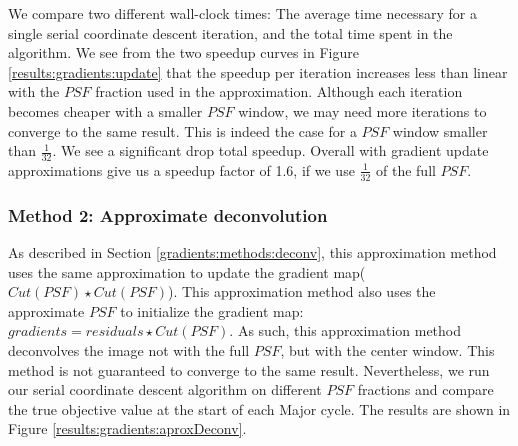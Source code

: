 We compare two different wall-clock times: The average time necessary for a single serial coordinate descent iteration, and the total time spent in the algorithm. We see from the two speedup curves in Figure \ref{results:gradients:update} that the speedup per iteration increases less than linear with the $PSF$ fraction used in the approximation. Although each iteration becomes cheaper with a smaller $PSF$ window, we may need more iterations to converge to the same result. This is indeed the case for a $PSF$ window smaller than $\frac{1}{32}$. We see a significant drop total speedup. Overall with gradient update approximations give us a speedup factor of 1.6, if we use $\frac{1}{32}$ of the full $PSF$.


\subsubsection{Method 2: Approximate deconvolution}
As described in Section \ref{gradients:methods:deconv}, this approximation method uses the same approximation to update the gradient map($Cut(PSF) \star Cut(PSF)$). This approximation method also uses the approximate $PSF$ to initialize the gradient map: $gradients = residuals \star Cut(PSF)$. As such, this approximation method deconvolves the image not with the full $PSF$, but with the center window. This method is not guaranteed to converge to the same result. Nevertheless, we run our serial coordinate descent algorithm on different $PSF$ fractions and compare the true objective value at the start of each Major cycle. The results are shown in Figure \ref{results:gradients:aproxDeconv}.

